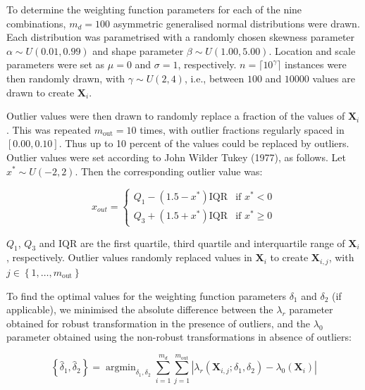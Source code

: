 \documentclass[
  a4paper,
]{article}
\DeclareMathOperator*{\argmin}{argmin}
\begin{document}
To determine the weighting function parameters for each of the nine
combinations, \(m_d=100\) asymmetric generalised normal distributions
were drawn. Each distribution was parametrised with a randomly chosen
skewness parameter \(\alpha \sim U\left(0.01, 0.99\right)\) and shape
parameter \(\beta \sim U\left(1.00, 5.00 \right)\). Location and scale
parameters were set as \(\mu = 0\) and \(\sigma = 1\), respectively.
\(n = \lceil 10^\gamma \rceil\) instances were then randomly drawn, with
\(\gamma \sim U\left(2, 4\right)\), i.e., between \(100\) and \(10000\)
values are drawn to create \(\mathbf{X}_i\).

Outlier values were then drawn to randomly replace a fraction of the
values of \(\mathbf{X}_i\). This was repeated \(m_{\text{out}} = 10\)
times, with outlier fractions regularly spaced in \([0.00, 0.10]\). Thus
up to 10 percent of the values could be replaced by outliers. Outlier
values were set according to John Wilder Tukey (1977), as follows. Let
\(x^{*} \sim U\left(-2, 2\right)\). Then the corresponding outlier value
was:

\begin{equation}
x_{out} =
\begin{cases}
Q_1 - \left(1.5 - x^{*} \right) \text{IQR} & \text{if } x^{*} < 0 \\
Q_3 + \left(1.5 + x^{*} \right) \text{IQR} & \text{if } x^{*} \geq 0
\end{cases}
\end{equation}

\(Q_1\), \(Q_3\) and \(\text{IQR}\) are the first quartile, third
quartile and interquartile range of \(\mathbf{X}_i\), respectively.
Outlier values randomly replaced values in \(\mathbf{X}_i\) to create
\(\mathbf{X}_{i,j}\), with
\(j \in \left\{ 1, \ldots, m_{\text{out}} \right\}\)

To find the optimal values for the weighting function parameters
\(\delta_1\) and \(\delta_2\) (if applicable), we minimised the absolute
difference between the \(\lambda_{r}\) parameter obtained for robust
transformation in the presence of outliers, and the \(\lambda_0\)
parameter obtained using the non-robust transformations in absence of
outliers:

\begin{equation}
\label{eqn:minimisation-weighting}
\left\{ \hat{\delta}_1, \hat{\delta}_2 \right\} = \argmin_{\delta_1, \delta_2} \sum_{i=1}^{m_d} \sum_{j=1}^{m_{\text{out}}} \left| \lambda_r \left(\mathbf{X}_{i, j}; \delta_1, \delta_2 \right) - \lambda_0 \left(\mathbf{X}_i \right) \right|
\end{equation}
\end{document}
